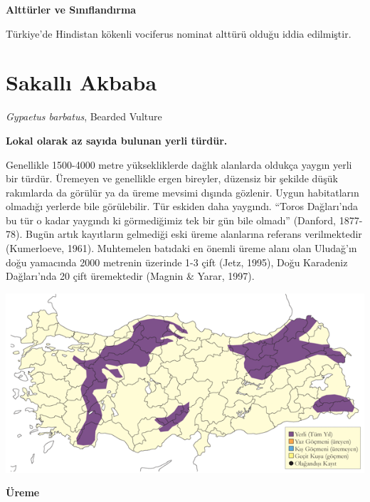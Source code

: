 \documentclass[
  a4paper,
  DIV=11,
  numbers=noendperiod]{scrreprt}
\begin{document}
\textbf{Alttürler ve Sınıflandırma}

Türkiye'de Hindistan kökenli vociferus nominat alttürü olduğu iddia
edilmiştir.

\section{Sakallı Akbaba}\label{sakallux131-akbaba}

\emph{Gypaetus barbatus}, Bearded Vulture

\textbf{Lokal olarak az sayıda bulunan yerli türdür.}

Genellikle 1500-4000 metre yüksekliklerde dağlık alanlarda oldukça
yaygın yerli bir türdür. Üremeyen ve genellikle ergen bireyler, düzensiz
bir şekilde düşük rakımlarda da görülür ya da üreme mevsimi dışında
gözlenir. Uygun habitatların olmadığı yerlerde bile görülebilir. Tür
eskiden daha yaygındı. ``Toros Dağları'nda bu tür o kadar yaygındı ki
görmediğimiz tek bir gün bile olmadı'' (Danford, 1877-78). Bugün artık
kayıtların gelmediği eski üreme alanlarına referans verilmektedir
(Kumerloeve, 1961). Muhtemelen batıdaki en önemli üreme alanı olan
Uludağ'ın doğu yamacında 2000 metrenin üzerinde 1-3 çift (Jetz, 1995),
Doğu Karadeniz Dağları'nda 20 çift üremektedir (Magnin \& Yarar, 1997).

\includegraphics{images/harita_Page_083.png}

\textbf{Üreme}
\end{document}
